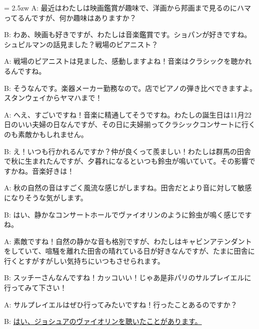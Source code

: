 \documentclass[11pt]{amsart}
\title{}
\author{}
\newenvironment{hangall}[1]{\hangindent = 2.5zw\everypar{\hangindent = 2.5zw}}{}
\begin{document}
\maketitle
\begin{hangall}{}%
A: 最近はわたしは映画鑑賞が趣味で、洋画から邦画まで見るのにハマってるんですが、何か趣味はありますか？

B: わあ、映画も好きですが、わたしは音楽鑑賞です。ショパンが好きですね。シュピルマンの話見ました？戦場のピアニスト？

A: 戦場のピアニストは見ました、感動しますよね！音楽はクラシックを聴かれるんですね。

B: そうなんです。楽器メーカー勤務なので。店でピアノの弾き比べできますよ。スタンウェイからヤマハまで！

A: へえ、すごいですね！音楽に精通してそうですね。わたしの誕生日は11月22日のいい夫婦の日なんですが、その日に夫婦揃ってクラシックコンサートに行くのも素敵かもしれません。

B: え！いつも行かれるんですか？仲が良くって羨ましい！わたしは群馬の田舎で秋に生まれたんですが、夕暮れになるといつも鈴虫が鳴いていて。その影響ですかね。音楽好きは！

A: 秋の自然の音はすごく風流な感じがしますね。田舎だとより音に対して敏感になりそうな気がします。

B: はい、静かなコンサートホールでヴァイオリンのように鈴虫が鳴く感じですね。

A: 素敵ですね！自然の静かな音も格別ですが、わたしはキャビンアテンダントをしていて、喧騒を離れた田舎の晴れている日が好きなんですが、たまに田舎に行くとすがすがしい気持ちにいつもさせられます。

B: スッチーさんなんですね！カッコいい！じゃあ是非パリのサルプレイエルに行ってみて下さい！

A: サルプレイエルはぜひ行ってみたいですね！行ったことあるのですか？

B: \ul{はい、ジョシュアのヴァイオリンを聴いたことがあります。}\end{hangall}
\end{document}
